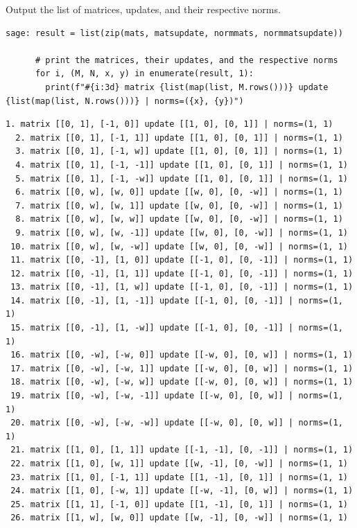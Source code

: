 \documentclass[runningheads]{llncs}
\begin{document}
Output the list of matrices, updates, and their respective norms.
\begin{lstlisting}
sage: result = list(zip(mats, matsupdate, normmats, normmatsupdate))

      # print the matrices, their updates, and the respective norms
      for i, (M, N, x, y) in enumerate(result, 1):
        print(f"#{i:3d} matrix {list(map(list, M.rows()))} update {list(map(list, N.rows()))} | norms=({x}, {y})")
\end{lstlisting}


\begin{lstlisting}[caption={Output candidate matrices, update matrices, and their respective norms. \label{list:here}}]
  1. matrix [[0, 1], [-1, 0]] update [[1, 0], [0, 1]] | norms=(1, 1)
  2. matrix [[0, 1], [-1, 1]] update [[1, 0], [0, 1]] | norms=(1, 1)
  3. matrix [[0, 1], [-1, w]] update [[1, 0], [0, 1]] | norms=(1, 1)
  4. matrix [[0, 1], [-1, -1]] update [[1, 0], [0, 1]] | norms=(1, 1)
  5. matrix [[0, 1], [-1, -w]] update [[1, 0], [0, 1]] | norms=(1, 1)
  6. matrix [[0, w], [w, 0]] update [[w, 0], [0, -w]] | norms=(1, 1)
  7. matrix [[0, w], [w, 1]] update [[w, 0], [0, -w]] | norms=(1, 1)
  8. matrix [[0, w], [w, w]] update [[w, 0], [0, -w]] | norms=(1, 1)
  9. matrix [[0, w], [w, -1]] update [[w, 0], [0, -w]] | norms=(1, 1)
 10. matrix [[0, w], [w, -w]] update [[w, 0], [0, -w]] | norms=(1, 1)
 11. matrix [[0, -1], [1, 0]] update [[-1, 0], [0, -1]] | norms=(1, 1)
 12. matrix [[0, -1], [1, 1]] update [[-1, 0], [0, -1]] | norms=(1, 1)
 13. matrix [[0, -1], [1, w]] update [[-1, 0], [0, -1]] | norms=(1, 1)
 14. matrix [[0, -1], [1, -1]] update [[-1, 0], [0, -1]] | norms=(1, 1)
 15. matrix [[0, -1], [1, -w]] update [[-1, 0], [0, -1]] | norms=(1, 1)
 16. matrix [[0, -w], [-w, 0]] update [[-w, 0], [0, w]] | norms=(1, 1)
 17. matrix [[0, -w], [-w, 1]] update [[-w, 0], [0, w]] | norms=(1, 1)
 18. matrix [[0, -w], [-w, w]] update [[-w, 0], [0, w]] | norms=(1, 1)
 19. matrix [[0, -w], [-w, -1]] update [[-w, 0], [0, w]] | norms=(1, 1)
 20. matrix [[0, -w], [-w, -w]] update [[-w, 0], [0, w]] | norms=(1, 1)
 21. matrix [[1, 0], [1, 1]] update [[-1, -1], [0, -1]] | norms=(1, 1)
 22. matrix [[1, 0], [w, 1]] update [[w, -1], [0, -w]] | norms=(1, 1)
 23. matrix [[1, 0], [-1, 1]] update [[1, -1], [0, 1]] | norms=(1, 1)
 24. matrix [[1, 0], [-w, 1]] update [[-w, -1], [0, w]] | norms=(1, 1)
 25. matrix [[1, 1], [-1, 0]] update [[1, -1], [0, 1]] | norms=(1, 1)
 26. matrix [[1, w], [w, 0]] update [[w, -1], [0, -w]] | norms=(1, 1)

\end{lstlisting}
\end{document}
